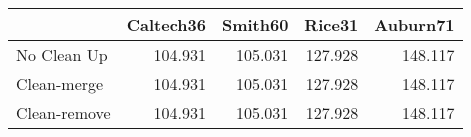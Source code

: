 \begin{tabular}{lrrrr}
\toprule
{} & Caltech36 & Smith60 &  Rice31 & Auburn71 \\
\midrule
No Clean Up  &   104.931 & 105.031 & 127.928 &  148.117 \\
Clean-merge  &   104.931 & 105.031 & 127.928 &  148.117 \\
Clean-remove &   104.931 & 105.031 & 127.928 &  148.117 \\
\bottomrule
\end{tabular}
